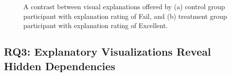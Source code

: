 \documentclass[conference]{IEEEtran}
\begin{document}
\begin{figure}[!t]
  \centering
  \caption{A contrast between visual explanations offered by (a) control group participant with explanation rating of Fail, and (b) treatment group participant with explanation rating of Excellent. \label{fig:partmelon}}
\end{figure}


\subsection{RQ3: Explanatory Visualizations Reveal Hidden Dependencies}
\end{document}
